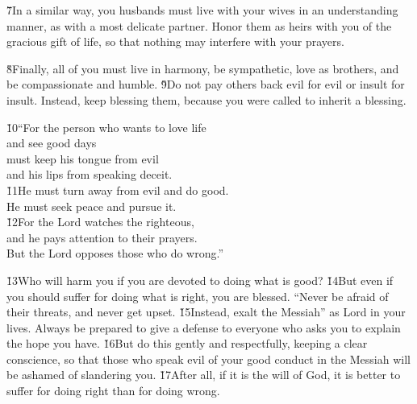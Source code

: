 \v{7}In a similar way, you husbands must live with your wives in an understanding manner, as with a most delicate partner. Honor them as heirs with you of the gracious gift of life, so that nothing may interfere with your prayers.

\v{8}Finally, all of you must live in harmony, be sympathetic, love as brothers, and be compassionate and humble. \v{9}Do not pay others back evil for evil or insult for insult. Instead, keep blessing them, because you were called to inherit a blessing.

\begin{poetry}
\poeml \v{10}``For the person who wants to love life \\
\poemll    and see good days \\
\poeml must keep his tongue from evil \\
\poemll    and his lips from speaking deceit. \\
\poeml \v{11}He must turn away from evil and do good. \\
\poemll    He must seek peace and pursue it. \\
\poeml \v{12}For the Lord watches the righteous, \\
\poemll    and he pays attention to their prayers. \\
\poeml But the Lord opposes those who do wrong.''
\end{poetry}

\v{13}Who will harm you if you are devoted to doing what is good? \v{14}But even if you should suffer for doing what is right, you are blessed. ``Never be afraid of their threats, and never get upset. \v{15}Instead, exalt the Messiah'' as Lord in your lives. Always be prepared to give a defense to everyone who asks you to explain the hope you have. \v{16}But do this gently and respectfully, keeping a clear conscience, so that those who speak evil of your good conduct in the Messiah will be ashamed of slandering you. \v{17}After all, if it is the will of God, it is better to suffer for doing right than for doing wrong.

